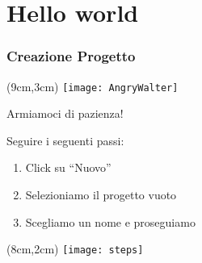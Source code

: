 \section{Hello world}
\begin{frame}
  \frametitle{Creazione Progetto}
  
    \begin{textblock*}{5cm}(9cm,3cm)
      \texttt{[image: AngryWalter]}
    \end{textblock*}
    
    \huge Armiamoci di pazienza!
\end{frame}

\begin{frame}
 
 Seguire i seguenti passi:
 \begin{enumerate}
  \item<1-> Click su ``Nuovo''
  \item<2-> Selezioniamo il progetto vuoto
  \item<3-> Scegliamo un nome e proseguiamo
 \end{enumerate}

 \begin{textblock*}{5cm}(8cm,2cm)
      \texttt{[image: steps]}
 \end{textblock*}
   
\end{frame}
